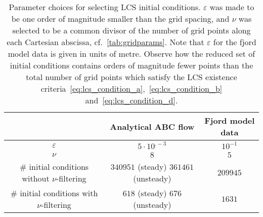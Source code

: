 \begin{table}[htpb]
    \centering
    \caption[Parameter choices for selecting LCS initial conditions]
    {Parameter choices for selecting LCS initial conditions. $\varepsilon$ was
    made to be one order of magnitude smaller than the grid spacing, and
    $\nu$ was selected to be a common divisor of the number of grid points
    along each Cartesian abscissa, cf.\ \cref{tab:gridparams}. Note that
    $\varepsilon$ for the fjord model data is given in units of metre. Observe
    how the reduced set of initial conditions contains orders of magnitude
    fewer points than the total number of grid points which satisfy the LCS
    existence criteria~\eqref{eq:lcs_condition_a},~\eqref{eq:lcs_condition_b}
    and~\eqref{eq:lcs_condition_d}.}
    \label{tab:initialconditionparams}
    \begin{tabular}{ccc}
        \toprule
        & Analytical ABC flow & Fjord model data\\
        \midrule
        $\varepsilon$ & $5\cdot10^{.-3}$ & $10^{-1}$\\
        $\nu$ & $8$ & $5$ \\[3pt]
        \makecell[c]{\# initial conditions\\without $\nu$-filtering} & \makecell[c]{$340951$ (steady) \\ $361461$ (unsteady)} & $209945$\\[9pt]
        \makecell[c]{\# initial conditions\\with $\nu$-filtering} & \makecell[c]{$618$ (steady)\\$676$ (unsteady)} & $1631$\\
        \bottomrule
    \end{tabular}
\end{table}
